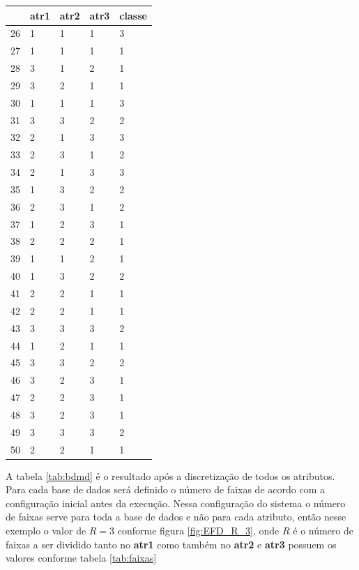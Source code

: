 \begin{table}[!ht]
\begin{tabular}{ |lllll| }
\hline
  & atr1 & atr2 & atr3 & classe \\ \hline
26	&	1	&	1	&	1	&	3	\\	\hline
27	&	1	&	1	&	1	&	1	\\	\hline
28	&	3	&	1	&	2	&	1	\\	\hline
29	&	3	&	2	&	1	&	1	\\	\hline
30	&	1	&	1	&	1	&	3	\\	\hline
31	&	3	&	3	&	2	&	2	\\	\hline
32	&	2	&	1	&	3	&	3	\\	\hline
33	&	2	&	3	&	1	&	2	\\	\hline
34	&	2	&	1	&	3	&	3	\\	\hline
35	&	1	&	3	&	2	&	2	\\	\hline
36	&	2	&	3	&	1	&	2	\\	\hline
37	&	1	&	2	&	3	&	1	\\	\hline
38	&	2	&	2	&	2	&	1	\\	\hline
39	&	1	&	1	&	2	&	1	\\	\hline
40	&	1	&	3	&	2	&	2	\\	\hline
41	&	2	&	2	&	1	&	1	\\	\hline
42	&	2	&	2	&	1	&	1	\\	\hline
43	&	3	&	3	&	3	&	2	\\	\hline
44	&	1	&	2	&	1	&	1	\\	\hline
45	&	3	&	3	&	2	&	2	\\	\hline
46	&	3	&	2	&	3	&	1	\\	\hline
47	&	2	&	2	&	3	&	1	\\	\hline
48	&	3	&	2	&	3	&	1	\\	\hline
49	&	3	&	3	&	3	&	2	\\	\hline
50	&	2	&	2	&	1	&	1	\\	\hline

\end{tabular}
\end{table}

A tabela \ref{tab:bdmd} é o resultado após a discretização de todos os atributos. Para cada base de dados será definido o número de faixas de acordo com a configuração inicial antes da execução. Nessa configuração do sistema o número de faixas serve para toda a base de dados e não para cada atributo, então nesse exemplo o valor de ${R=3}$ conforme figura \ref{fig:EFD_R_3}, onde ${R}$ é o número de faixas a ser dividido tanto no \textbf{atr1} como também no \textbf{atr2} e \textbf{atr3} possuem os valores conforme tabela \ref{tab:faixas}

